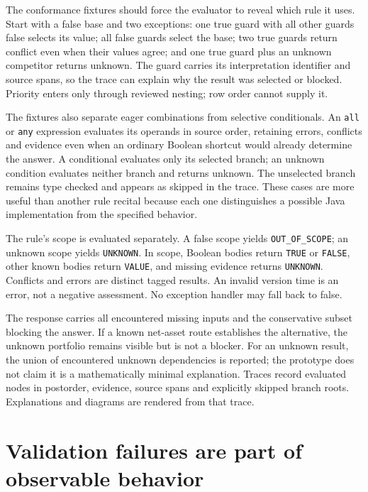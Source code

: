 The conformance fixtures should force the evaluator to reveal which rule it uses. Start
with a false base and two exceptions: one true guard with all other guards false selects
its value; all false guards select the base; two true guards return conflict even when
their values agree; and one true guard plus an unknown competitor returns unknown. The
guard carries its interpretation identifier and source spans, so the trace can explain
why the result was selected or blocked. Priority enters only through reviewed nesting;
row order cannot supply it.

The fixtures also separate eager combinations from selective conditionals. An \texttt{all} or \texttt{any}
expression evaluates its operands in source order, retaining
errors, conflicts and evidence even when an ordinary Boolean shortcut would already
determine the answer. A conditional evaluates only its selected branch; an unknown
condition evaluates neither branch and returns unknown. The unselected branch remains
type checked and appears as skipped in the trace. These cases are more useful than another rule
recital because each one distinguishes a possible Java implementation
from the specified behavior.


The rule's scope is evaluated separately. A false scope yields
\texttt{OUT\_OF\_SCOPE}; an unknown scope yields \texttt{UNKNOWN}. In scope,
Boolean bodies return \texttt{TRUE} or \texttt{FALSE}, other known bodies return
\texttt{VALUE}, and missing evidence returns \texttt{UNKNOWN}. Conflicts and
errors are distinct tagged results. An invalid version time is an error, not a
negative assessment. No exception handler may fall back to false.

The response carries all encountered missing inputs and the conservative subset
blocking the answer. If a known net-asset route establishes the alternative,
the unknown portfolio remains visible but is not a blocker. For an unknown
result, the union of encountered unknown dependencies is reported; the prototype
does not claim it is a mathematically minimal explanation. Traces record evaluated
nodes in postorder, evidence, source spans and explicitly skipped branch roots.
Explanations and diagrams are rendered from that trace.

\section{Validation failures are part of observable behavior}
\label{merge:M07:04}


